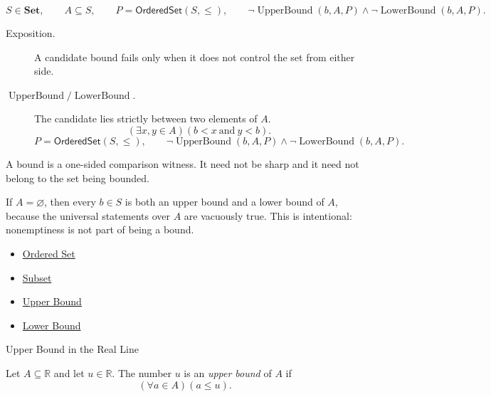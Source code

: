 \begin{remark*}
\[
  S\in\mathbf{Set},\qquad A\subseteq S,\qquad P=\mathsf{OrderedSet}(S,\leq),\qquad
  \neg\operatorname{UpperBound}(b,A,P)
  \land
  \neg\operatorname{LowerBound}(b,A,P).
\]
\end{remark*}

\begin{remark*}
\begin{description}
  \item[Exposition.]
  A candidate bound fails only when it does not control the set from either
  side.

  \item[\(\operatorname{UpperBound} / \operatorname{LowerBound}.\)]
  The candidate lies strictly between two elements of $A$.
  \[
    (\exists x,y\in A)(b<x\ \text{and}\ y<b).
  \]
  \[
    P=\mathsf{OrderedSet}(S,\leq),\qquad
    \neg\operatorname{UpperBound}(b,A,P)
    \land
    \neg\operatorname{LowerBound}(b,A,P).
  \]
\end{description}
\end{remark*}

\begin{remark*}[Interpretation]
A bound is a one-sided comparison witness.  It need not be sharp and it
need not belong to the set being bounded.
\end{remark*}

\begin{remark*}[Exposition]
If $A=\varnothing$, then every $b\in S$ is both an upper bound and a lower
bound of $A$, because the universal statements over $A$ are vacuously true.
This is intentional: nonemptiness is not part of being a bound.
\end{remark*}

\begin{dependencies}
\begin{itemize}
  \item \hyperref[def:ordered-set]{Ordered Set}
  \item \hyperref[def:subset]{Subset}
  \item \hyperref[def:upper-bound]{Upper Bound}
  \item \hyperref[def:lower-bound]{Lower Bound}
\end{itemize}
\end{dependencies}

\begin{definitionbox}{Upper Bound in the Real Line}
\begin{definition}
\label{def:real-upper-bound}
Let $A\subseteq\mathbb{R}$ and let $u\in\mathbb{R}$. The number $u$ is an
\emph{upper bound} of $A$ if
\[
  (\forall a\in A)(a\leq u).
\]
\end{definition}
\end{definitionbox}

